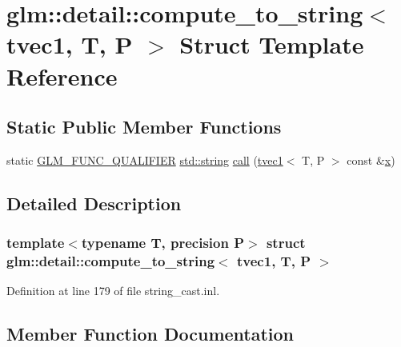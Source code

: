 \hypertarget{structglm_1_1detail_1_1compute__to__string_3_01tvec1_00_01_t_00_01_p_01_4}{}\section{glm\+::detail\+::compute\+\_\+to\+\_\+string$<$ tvec1, T, P $>$ Struct Template Reference}
\label{structglm_1_1detail_1_1compute__to__string_3_01tvec1_00_01_t_00_01_p_01_4}
\subsection*{Static Public Member Functions}
\begin{DoxyCompactItemize}
\item 
static \mbox{\hyperlink{setup_8hpp_a33fdea6f91c5f834105f7415e2a64407}{G\+L\+M\+\_\+\+F\+U\+N\+C\+\_\+\+Q\+U\+A\+L\+I\+F\+I\+ER}} \mbox{\hyperlink{glad_8h_ac83513893df92266f79a515488701770}{std\+::string}} \mbox{\hyperlink{structglm_1_1detail_1_1compute__to__string_3_01tvec1_00_01_t_00_01_p_01_4_ae459fc0d0afddfc2f977012f95210bd2}{call}} (\mbox{\hyperlink{structglm_1_1tvec1}{tvec1}}$<$ T, P $>$ const \&\mbox{\hyperlink{glad_8h_a92d0386e5c19fb81ea88c9f99644ab1d}{x}})
\end{DoxyCompactItemize}


\subsection{Detailed Description}
\subsubsection*{template$<$typename T, precision P$>$\newline
struct glm\+::detail\+::compute\+\_\+to\+\_\+string$<$ tvec1, T, P $>$}



Definition at line 179 of file string\+\_\+cast.\+inl.



\subsection{Member Function Documentation}
\mbox{\label{structglm_1_1detail_1_1compute__to__string_3_01tvec1_00_01_t_00_01_p_01_4_ae459fc0d0afddfc2f977012f95210bd2}} 
